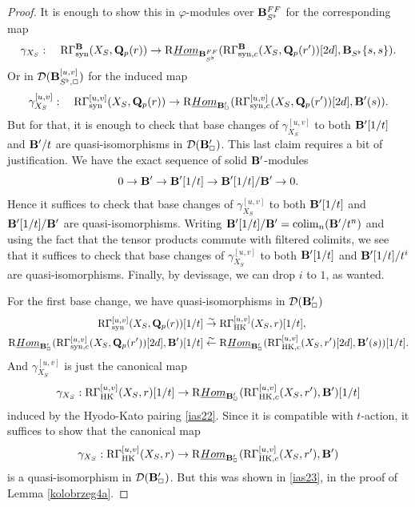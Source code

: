 \documentclass[10pt,reqno]{amsart}
\theoremstyle{definition}
\theoremstyle{remark}
\def\phi{\varphi}
\newcommand{\colim}{\operatorname{colim} }
\newcommand{\uHom}{\underline{{\rm{Hom}} }}
\newcommand{\synt}{ \operatorname{syn} }
\newcommand{\hk}{\operatorname{HK} }
\newcommand{\sd}{{\mathcal{D}}}
\numberwithin{equation}{section}
\def\R{{\mathrm R}}
\def\Q{{\bf Q}} \def\Z{{\bf Z}}
\numberwithin{equation}{section}
\begin{document}
\begin{proof}
It is enough  to show this in $\phi$-modules over $\B^{\rm FF}_{S^{\flat}}$ for the corresponding map  
\begin{equation}\label{kolobrzeg3}
\gamma_{X_S}:\quad \R\Gamma^{\B}_{\synt}(X_S,\Q_p(r))\to \R\uHom_{\B^{\rm FF}_{S^{\flat}}}(\R\Gamma^{\B}_{\synt,c}(X_S,\Q_p(r^{\prime}))[2d],\B_{S^{\flat}}\{s,s\}).
\end{equation}
Or in $\sd(\B^{[u,v]}_{S^{\flat},\Box})$ for the induced map
$$
\gamma^{[u,v]}_{X_S}:\quad \R\Gamma^{[u,v]}_{\synt}(X_S,\Q_p(r))\to  \R\uHom_{\B^{\prime}_{\Box}}(\R\Gamma^{[u,v]}_{\synt,c}(X_S,\Q_p(r^{\prime}))[2d],\B^{\prime}(s)).
$$
But for that,  it is enough to check 
that base changes of  $\gamma^{[u,v]}_{X_S}$ to both ${\bf B}^{\prime}[1/t]$ and ${\bf B}^{\prime}/t$ are quasi-isomorphisms in $\sd(\B^{\prime}_{\Box})$. This last claim requires a bit of justification. We have the exact sequence of solid ${\bf B}^{\prime}$-modules
$$
0\to {\bf B}^{\prime}\to {\bf B}^{\prime}[1/t]\to {\bf B}^{\prime}[1/t]/{\bf B}^{\prime}\to 0.
$$
Hence it suffices to check that base changes of  $\gamma^{[u,v]}_{X_S}$ to both ${\bf B}^{\prime}[1/t]$ and ${\bf B}^{\prime}[1/t]/{\bf B}^{\prime}$ are quasi-isomorphisms. Writing $\B^{\prime}[1/t]/\B^{\prime}=\colim_n(\B^{\prime}/t^n)$ and using the fact that the tensor products commute with filtered colimits, we see that  it suffices to check that base changes of  $\gamma^{[u,v]}_{X_S}$ to both ${\bf B}^{\prime}[1/t]$ and ${\bf B}^{\prime}[1/t]/t^i$ are quasi-isomorphisms. Finally, by devissage, we can drop $i$ to $1$, as wanted.



 For the first base change, we  have quasi-isomorphisms in $\sd(\B^{\prime}_{\Box})$
\begin{align*}
 \R\Gamma^{{[u,v]}}_{\synt}(X_S,\Q_p(r))[1/t] & \stackrel{\sim}{\to} \R\Gamma^{{[u,v]}}_{\hk}(X_S,r)[1/t],\\
\R\uHom_{\B^{\prime}_{\Box}}(\R\Gamma^{{[u,v]}}_{\synt,c}(X_S,\Q_p(r^{\prime}))[2d],\B^{\prime})[1/t] &  \stackrel{\sim}{\leftarrow} \R\uHom_{\B^{\prime}_{\Box}}(\R\Gamma^{{[u,v]}}_{\hk,c}(X_S,r^{\prime})[2d], 
\B^{\prime}(s))[1/t].
\end{align*}
And $\gamma^{[u,v]}_{X_S}$ is just the canonical map
$$
\gamma_{X_S}: \R\Gamma^{{[u,v]}}_{\hk}(X_S,r)[1/t] \to \R\uHom_{\B^{\prime}_{\Box}}(\R\Gamma^{{[u,v]}}_{\hk,c}(X_S,r^{\prime}), \B^{\prime})[1/t]
$$
induced by the Hyodo-Kato pairing \eqref{ias22}. Since it is compatible with $t$-action, it suffices to show that 
the canonical map
$$
\gamma_{X_S}: \R\Gamma^{{[u,v]}}_{\hk}(X_S,r) \to \R\uHom_{\B^{\prime}_{\Box}}(\R\Gamma^{{[u,v]}}_{\hk,c}(X_S,r^{\prime}),\B^{\prime})
$$
is a quasi-isomorphism in $\sd(\B^{\prime}_{\Box})$. But this was shown  in \eqref{ias23}, in  the proof of Lemma \ref{kolobrzeg4a}.


\end{proof}
\end{document}
